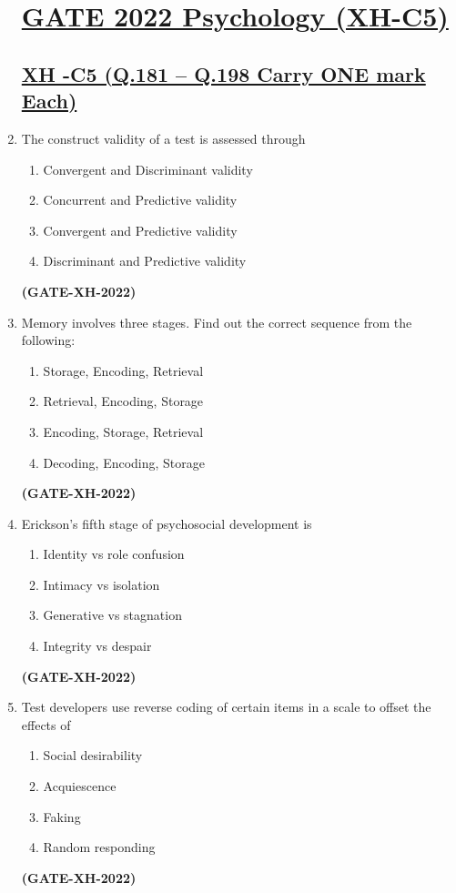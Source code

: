 \documentclass[journal]{IEEEtran}
\begin{document}
\begin{enumerate}
\section*{\large \underline{\textbf {GATE 2022 Psychology (XH-C5)}}}
\subsection*{\underline{\textbf {XH -C5 (Q.181 – Q.198 Carry ONE mark Each)}}}

\item The construct validity of a test is assessed through
\begin{enumerate}
\item Convergent and Discriminant validity
\item Concurrent and Predictive validity
\item Convergent and Predictive validity
\item Discriminant and Predictive validity
\end{enumerate}
\hfill\textbf{(GATE-XH-2022)}

\item Memory involves three stages. Find out the correct sequence from the following:
\begin{multicols}{2}
\begin{enumerate}
\item Storage, Encoding, Retrieval
\item Retrieval, Encoding, Storage
\item Encoding, Storage, Retrieval
\item Decoding, Encoding, Storage
\end{enumerate}
\end{multicols}
\hfill\textbf{(GATE-XH-2022)}

\item Erickson’s fifth stage of psychosocial development is
\begin{multicols}{2}
\begin{enumerate}
\item Identity vs role confusion
\item Intimacy vs isolation 
\item Generative vs stagnation
\item Integrity vs despair
\end{enumerate}
\end{multicols}
\hfill\textbf{(GATE-XH-2022)}

\item Test developers use reverse coding of certain items in a scale to offset the effects of
\begin{multicols}{2}
\begin{enumerate}
\item Social desirability
\item Acquiescence
\item Faking
\item Random responding
\end{enumerate}
\end{multicols}
\hfill\textbf{(GATE-XH-2022)}


\end{enumerate}
\end{document}
